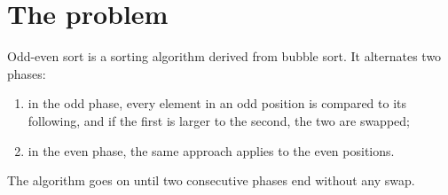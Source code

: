 \section{The problem}
Odd-even sort is a sorting algorithm derived from bubble sort. It alternates two phases:
\begin{enumerate}
    \item in the odd phase, every element in an odd position is compared to its following, and if the first is larger to the second, the two are swapped;
    \item in the even phase, the same approach applies to the even positions.
\end{enumerate}
The algorithm goes on until two consecutive phases end without any swap.
